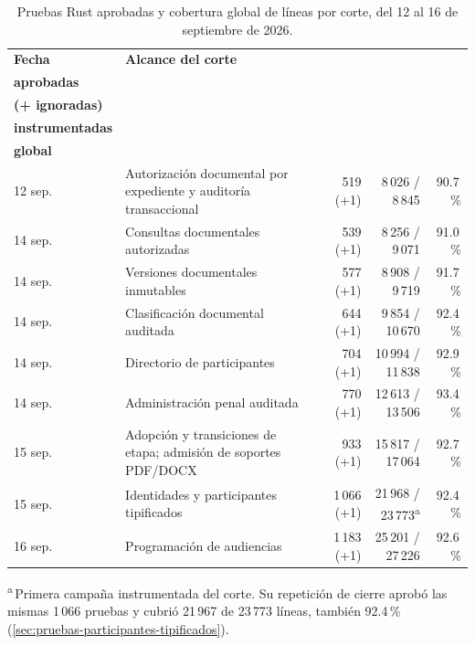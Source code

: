 \begin{table}[H]
  \centering
  \caption[Evolución de la cobertura global por corte]{Pruebas Rust aprobadas y cobertura global de líneas por corte, del 12 al 16 de septiembre de 2026.}
  \label{tab:pruebas-cobertura-evolucion}
  
  \begin{tabularx}{\linewidth}{@{}l >{\raggedright\arraybackslash}X r r r@{}}
    \toprule
    \textbf{Fecha} & \textbf{Alcance del corte} & \makecell[r]{\textbf{Pruebas}\\\textbf{aprobadas}\\\textbf{(+ ignoradas)}} & \makecell[r]{\textbf{Líneas cubiertas /}\\\textbf{instrumentadas}} & \makecell[r]{\textbf{Cobertura}\\\textbf{global}} \\
    \midrule
    12 sep. & Autorización documental por expediente y auditoría transaccional & 519 (+1) & 8\,026 / 8\,845 & 90.7\,\% \\
    14 sep. & Consultas documentales autorizadas & 539 (+1) & 8\,256 / 9\,071 & 91.0\,\% \\
    14 sep. & Versiones documentales inmutables & 577 (+1) & 8\,908 / 9\,719 & 91.7\,\% \\
    14 sep. & Clasificación documental auditada & 644 (+1) & 9\,854 / 10\,670 & 92.4\,\% \\
    14 sep. & Directorio de participantes & 704 (+1) & 10\,994 / 11\,838 & 92.9\,\% \\
    14 sep. & Administración penal auditada & 770 (+1) & 12\,613 / 13\,506 & 93.4\,\% \\
    15 sep. & Adopción y transiciones de etapa; admisión de soportes \mbox{PDF/DOCX} & 933 (+1) & 15\,817 / 17\,064 & 92.7\,\% \\
    15 sep. & Identidades y participantes tipificados & 1\,066 (+1) & 21\,968 / 23\,773\textsuperscript{a} & 92.4\,\% \\
    16 sep. & Programación de audiencias & 1\,183 (+1) & 25\,201 / 27\,226 & 92.6\,\% \\
    \bottomrule
  \end{tabularx}

  \smallskip
  {\raggedright \textsuperscript{a}\,Primera campaña instrumentada del corte. Su repetición de cierre aprobó las mismas 1\,066 pruebas y cubrió 21\,967 de 23\,773 líneas, también 92.4\,\% (\cref{sec:pruebas-participantes-tipificados}).\par}
\end{table}


